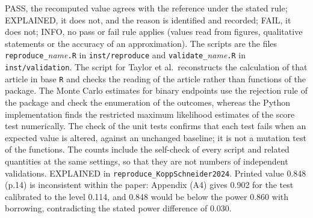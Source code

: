 \begin{table}[!htb]
\begin{minipage}{0.95\linewidth}
\footnotesize
PASS, the recomputed value agrees with the reference under the stated rule; EXPLAINED, it does not, and the reason is identified and recorded; FAIL, it does not; INFO, no pass or fail rule applies (values read from figures, qualitative statements or the accuracy of an approximation). The scripts are the files \texttt{reproduce\_}\textit{name}\texttt{.R} in \texttt{inst/reproduce} and \texttt{validate\_}\textit{name}\texttt{.R} in \texttt{inst/validation}. The script for Taylor et al.\ reconstructs the calculation of that article in base \texttt{R} and checks the reading of the article rather than functions of the package. The Monte Carlo estimates for binary endpoints use the rejection rule of the package and check the enumeration of the outcomes, whereas the Python implementation finds the restricted maximum likelihood estimates of the score test numerically. The check of the unit tests confirms that each test fails when an expected value is altered, against an unchanged baseline; it is not a mutation test of the functions. The counts include the self-check of every script and related quantities at the same settings, so that they are not numbers of independent validations. EXPLAINED in \texttt{reproduce\_KoppSchneider2024}. Printed value 0.848 (p.14) is inconsistent within the paper: Appendix (A4) gives 0.902 for the test calibrated to the level 0.114, and 0.848 would be below the power 0.860 with borrowing, contradicting the stated power difference of 0.030.
\end{minipage}
\end{table}
